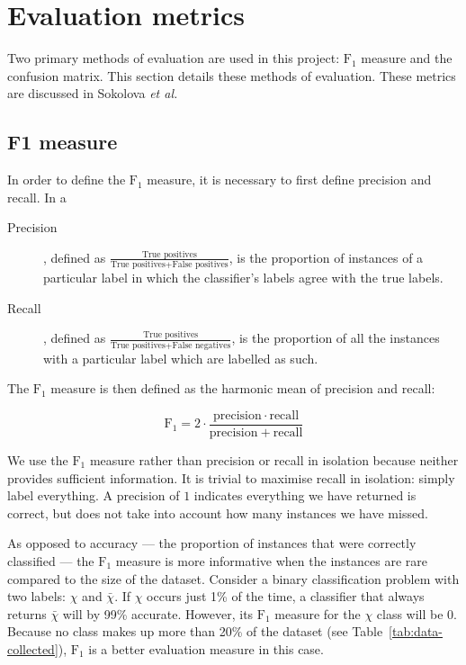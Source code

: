   \section{Evaluation metrics}
    Two primary methods of evaluation are used in this project: $\mathrm{F}_1$ measure and the confusion matrix.
    This section details these methods of evaluation. These metrics are discussed in Sokolova \emph{et al.}\cite{sokolova2009systematic}
    \subsection{F1 measure}
      In order to define the $\mathrm{F}_1$ measure, it is necessary to first define precision and recall. In a 
      \begin{description}
        \item[Precision], defined as $\frac{\text{True positives}}{\text{True positives} + \text{False positives}}$, is the proportion of instances of a particular label in which the classifier's labels agree with the true labels.
        \item[Recall], defined as $\frac{\text{True positives}}{\text{True positives} + \text{False negatives}}$, is the proportion of all the instances with a particular label which are labelled as such. 
      \end{description}
      
      The $\mathrm{F}_1$ measure is then defined as the harmonic mean of precision and recall:
      
      $$\mathrm{F}_1 = 2 \cdot \frac{\mathrm{precision} \cdot \mathrm{recall}}{\mathrm{precision} + \mathrm{recall}}$$
      
      We use the $\mathrm{F}_1$ measure rather than precision or recall in isolation because neither provides sufficient information. It is trivial to maximise recall in isolation: simply label everything. A precision of $1$ indicates everything we have returned is correct, but does not take into account how many instances we have missed.
      
      As opposed to accuracy --- the proportion of instances that were correctly classified --- the $\mathrm{F}_1$ measure is more informative when the instances are rare compared to the size of the dataset. Consider a binary classification problem with two labels: $\chi$ and $\bar{\chi}$. If $\chi$ occurs just 1\% of the time, a classifier that always returns $\bar{\chi}$ will by 99\% accurate. However, its  $\mathrm{F}_1$ measure for the $\chi$ class will be 0. Because no class makes up more than 20\% of the dataset (see Table~\ref{tab:data-collected}), $\mathrm{F}_1$ is a better evaluation measure in this case.
    

